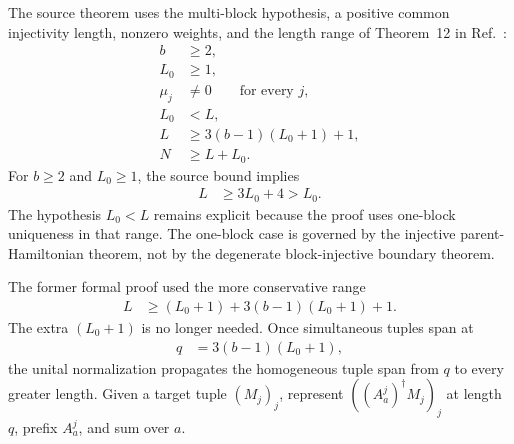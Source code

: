 \documentclass{article}
\begin{document}
The source theorem uses the multi-block hypothesis, a positive common
injectivity length, nonzero weights, and the length range of Theorem~12 in
Ref.~\cite{PerezGarcia2007MPSReps}:
\begin{align}
  b
    &\geq
    2,
  \label{eq:cpgsv21_block_diagonal_parent_ground_space_hyp_blocks}\\
  L_0
    &\geq
    1,
  \label{eq:cpgsv21_block_diagonal_parent_ground_space_hyp_injectivity}\\
  \mu_j
    &\neq
    0
    \qquad\text{for every }j,
  \label{eq:cpgsv21_block_diagonal_parent_ground_space_hyp_weights}\\
  L_0
    &<
    L,
  \label{eq:cpgsv21_block_diagonal_parent_ground_space_hyp_local_strict}\\
  L
    &\geq
    3(b-1)(L_0+1)+1,
  \label{eq:cpgsv21_block_diagonal_parent_ground_space_hyp_local_bound}\\
  N
    &\geq
    L+L_0.
  \label{eq:cpgsv21_block_diagonal_parent_ground_space_hyp_global_bound}
\end{align}
For $b\geq2$ and $L_0\geq1$, the source bound implies
\begin{align}
  L
    &\geq
    3L_0+4
    >
    L_0.
  \label{eq:cpgsv21_block_diagonal_parent_ground_space_implied_strict_bound}
\end{align}
The hypothesis $L_0<L$ remains explicit because the proof uses one-block
uniqueness in that range. The one-block case is governed by the injective
parent-Hamiltonian theorem, not by the degenerate block-injective boundary
theorem.

The former formal proof used the more conservative range
\begin{align}
  L
    &\geq
    (L_0+1)+3(b-1)(L_0+1)+1.
  \label{eq:cpgsv21_block_diagonal_parent_ground_space_old_length_bound}
\end{align}
The extra $(L_0+1)$ is no longer needed. Once simultaneous tuples span at
\begin{align}
  q
    &=
    3(b-1)(L_0+1),
  \label{eq:cpgsv21_block_diagonal_parent_ground_space_base_span_length}
\end{align}
the unital normalization propagates the homogeneous tuple span from $q$ to
every greater length. Given a target tuple $(M_j)_j$, represent
$((A^j_a)^\dagger M_j)_j$ at length $q$, prefix $A^j_a$, and sum over $a$.
\end{document}
